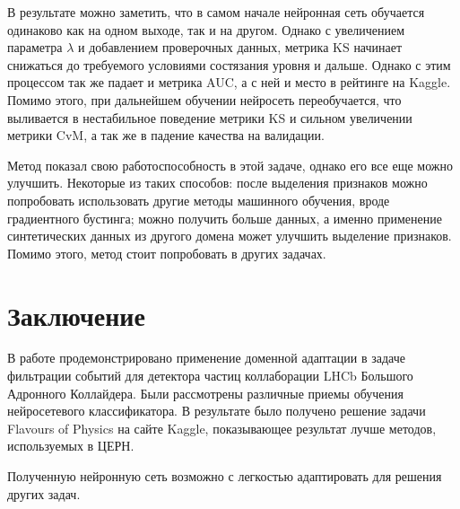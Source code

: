 \documentclass[14pt]{extarticle}
\begin{document}
В результате можно заметить, что в самом начале нейронная сеть обучается одинаково как на одном выходе, так и на другом. Однако с увеличением параметра $\lambda$ и добавлением проверочных данных, метрика KS начинает снижаться до требуемого условиями состязания уровня и дальше. Однако с этим процессом так же падает и метрика AUC, а с ней и место в рейтинге на Kaggle. Помимо этого, при дальнейшем обучении нейросеть переобучается, что выливается в нестабильное поведение метрики KS и сильном увеличении метрики CvM, а так же в падение качества на валидации. 

Метод показал свою работоспособность в этой задаче, однако его все еще можно улучшить. Некоторые из таких способов: после выделения признаков можно попробовать использовать другие методы машинного обучения, вроде градиентного бустинга; можно получить больше данных, а именно применение синтетических данных из другого домена может улучшить выделение признаков. Помимо этого, метод стоит попробовать в других задачах.

\newpage
\section*{Заключение}

В работе продемонстрировано применение доменной адаптации в задаче фильтрации событий для детектора частиц коллаборации LHCb Большого Адронного Коллайдера. Были рассмотрены различные приемы обучения нейросетевого классификатора. В результате было получено решение задачи Flavours of Physics на сайте Kaggle, показывающее результат лучше методов, используемых в ЦЕРН. 

Полученную нейронную сеть возможно с легкостью адаптировать для решения других задач.

\newpage
{}
\end{document}

